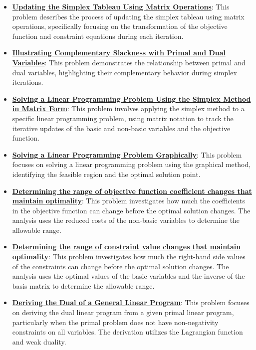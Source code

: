 \documentclass{article}%
\begin{document}
\begin{itemize}[leftmargin=*]
\item \href{https://www.math.purdue.edu/~yipn/421/2024-09-24-SimplexMatrix.pdf#page=10}{\textbf{Updating the Simplex Tableau Using Matrix Operations}}: This problem describes the process of updating the simplex tableau using matrix operations, specifically focusing on the transformation of the objective function and constraint equations during each iteration.%
\item \href{https://www.math.purdue.edu/~yipn/421/2024-09-24-SimplexMatrix.pdf#page=14}{\textbf{Illustrating Complementary Slackness with Primal and Dual Variables}}: This problem demonstrates the relationship between primal and dual variables, highlighting their complementary behavior during simplex iterations.%
\item \href{https://www.math.purdue.edu/~yipn/421/2024-09-24-SimplexMatrix.pdf#page=15}{\textbf{Solving a Linear Programming Problem Using the Simplex Method in Matrix Form}}: This problem involves applying the simplex method to a specific linear programming problem, using matrix notation to track the iterative updates of the basic and non-basic variables and the objective function.%
\item \href{https://www.math.purdue.edu/~yipn/421/2024-09-24-SimplexMatrix.pdf#page=21}{\textbf{Solving a Linear Programming Problem Graphically}}: This problem focuses on solving a linear programming problem using the graphical method, identifying the feasible region and the optimal solution point.%
\item \href{https://www.math.purdue.edu/~yipn/421/2024-09-26-Sensitivity.pdf#page=4}{\textbf{Determining the range of objective function coefficient changes that maintain optimality}}: This problem investigates how much the coefficients in the objective function can change before the optimal solution changes. The analysis uses the reduced costs of the non-basic variables to determine the allowable range.%
\item \href{https://www.math.purdue.edu/~yipn/421/2024-09-26-Sensitivity.pdf#page=8}{\textbf{Determining the range of constraint value changes that maintain optimality}}: This problem investigates how much the right-hand side values of the constraints can change before the optimal solution changes. The analysis uses the optimal values of the basic variables and the inverse of the basis matrix to determine the allowable range.%
\item \href{https://www.math.purdue.edu/~yipn/421/2024-10-01-DualGeneralLP.pdf#page=1}{\textbf{Deriving the Dual of a General Linear Program}}: This problem focuses on deriving the dual linear program from a given primal linear program, particularly when the primal problem does not have non-negativity constraints on all variables. The derivation utilizes the Lagrangian function and weak duality.%

\end{itemize}
\end{document}
